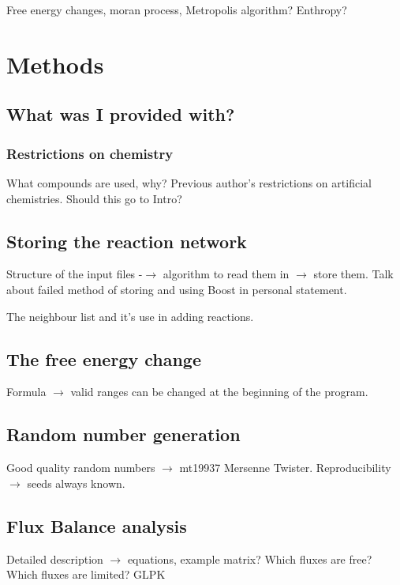 \documentclass[]{article}
\begin{document}
Free energy changes, moran process, Metropolis algorithm? Enthropy?


\section{Methods}
\label{sec:methods}

\subsection{What was I provided with?}
\label{sub:What was I provided with?}
\subsubsection{Restrictions on chemistry}
\label{ssub:Restrictions on chemistry}
What compounds are used, why? Previous author's restrictions on artificial chemistries. Should this go to Intro?
\subsection{Storing the reaction network}
\label{sub:Storing the reaction network}
Structure of the input files -$\rightarrow$ algorithm to read them in $\rightarrow$ store them. Talk about failed method of storing and using Boost in personal statement.

The neighbour list and it's use in adding reactions.
\subsection{The free energy change}
\label{sub:The free energy change}
Formula $\rightarrow$ valid ranges can be changed at the beginning of the program.

\subsection{Random number generation}
\label{sub:Random number generation}

Good quality random numbers $\rightarrow$ mt19937 Mersenne Twister. Reproducibility $\rightarrow$ seeds always known. 



\subsection{Flux Balance analysis}
\label{sub:Flux Balance analysis}

Detailed description $\rightarrow$ equations, example matrix? Which fluxes are free? Which fluxes are limited? GLPK 
\end{document}
